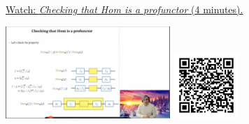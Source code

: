 
\begin{minipage}{10cm}
    \href{https://act4e-spring21.netlify.app/videos/spring2021-profunctors:hom-prof-check.html}{Watch: \emph{Checking that Hom is a profunctor} (4 minutes).}
        
    \href{https://act4e-spring21.netlify.app/videos/spring2021-profunctors:hom-prof-check.html}{\includegraphics[height=3.5cm]{spring2021-profunctors:hom-prof-check/thumbnails.jpg}}
    \href{https://act4e-spring21.netlify.app/videos/spring2021-profunctors:hom-prof-check.html}{\includegraphics[height=2.5cm]{spring2021-profunctors:hom-prof-check/qrcode.png}}
\end{minipage}
